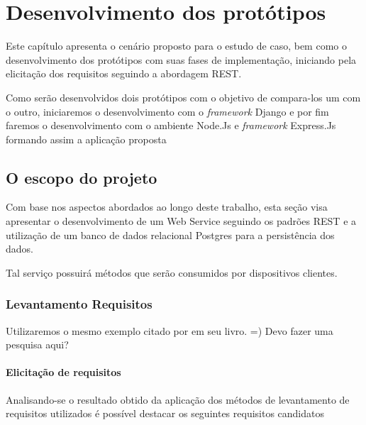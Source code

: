 \chapter{Desenvolvimento dos protótipos}
\label{desenvolvimento-prototipos}

\vspace{-1.9cm}


  Este capítulo apresenta o cenário proposto para o estudo de caso, bem
  como o desenvolvimento dos protótipos com suas fases de implementação, iniciando
  pela elicitação dos requisitos seguindo a abordagem \ac{REST}.
  
  Como serão desenvolvidos dois protótipos com o objetivo de compara-los um com o outro,
  iniciaremos o desenvolvimento com o \textit{framework} Django e por fim faremos o desenvolvimento
  com o ambiente Node.Js e \textit{framework} Express.Js formando assim a aplicação proposta
  
\section{O escopo do projeto}
\label{escopo-projeto}

  Com base nos aspectos abordados ao longo deste trabalho, 
  esta seção visa apresentar o desenvolvimento de um Web Service seguindo os padrões \ac{REST} e a utilização 
  de um banco de dados relacional Postgres para a persistência dos dados.
  
  Tal serviço possuirá métodos que serão consumidos por dispositivos clientes.

\subsection{Levantamento Requisitos}
\label{levantamento-requisitos}

  Utilizaremos o mesmo exemplo citado por \cite{Pereira:2013} em seu livro. =)
  Devo fazer uma pesquisa aqui?

\subsubsection{Elicitação de requisitos}

  Analisando-se o resultado obtido da aplicação dos métodos de levantamento
  de requisitos utilizados é possível destacar os seguintes requisitos candidatos

